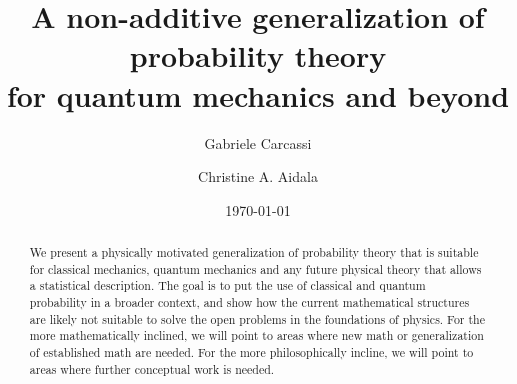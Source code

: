\documentclass[10pt,twocolumn, nofootinbib]{revtex4-2}
\begin{document}
\title{A non-additive generalization of probability theory \\for quantum mechanics and beyond}
\author{Gabriele Carcassi}
\author{Christine A. Aidala}

\date{\today}


\begin{abstract}
	We present a physically motivated generalization of probability theory that is suitable for classical mechanics, quantum mechanics and any future physical theory that allows a statistical description. The goal is to put the use of classical and quantum probability in a broader context, and show how the current mathematical structures are likely not suitable to solve the open problems in the foundations of physics. For the more mathematically inclined, we will point to areas where new math or generalization of established math are needed. For the more philosophically incline, we will point to areas where further conceptual work is needed.
	
	
\end{abstract}

\maketitle

\end{document}

